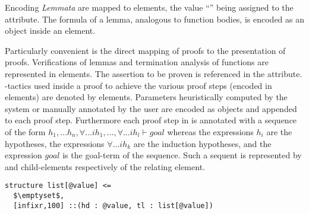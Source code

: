 \begin{omgroup}[id=verifun,short=VeriFun,creators={nmueller}]
\begin{omgroup}{Encoding}
{\emph{Lemmata}} are mapped to {} elements, the value
``{}'' being assigned to the {}
attribute. The formula of a lemma, analogous to function bodies, is encoded as an
{\openmath} object inside an {} element.

Particularly convenient is the direct mapping of {\verifun} proofs to the {\omdoc}
presentation of proofs. Verifications of lemmas and termination analysis of functions are
represented in {} elements. The assertion to be proven is referenced in the
{} attribute. {}-tactics used inside a proof to achieve the
various proof steps (encoded in { elements}) are denoted by
{} elements. Parameters heuristically computed by the system or manually
annotated by the user are encoded as {\openmath} objects and appended to each proof
step. Furthermore each proof step in {\verifun} is annotated with a sequence of the form
$h_1, \dots h_n, \forall \dots ih_1, \dots, \forall \dots ih_l \vdash goal$ whereas the
expressions $h_i$ are the hypotheses, the expressions $\forall \dots ih_k$ are the
induction hypotheses, and the expression $goal$ is the goal-term of the sequence. Such a
sequent is represented by {} and {} child-elements
respectively of the relating {} element.
\begin{lstlisting}[escapechar=\%,mathescape,label=lst:vf:adt,caption={A polymorphic {\verifun} sort}]
structure list[@value] <=
  $\emptyset$,
  [infixr,100] ::(hd : @value, tl : list[@value])
\end{lstlisting}


\end{omgroup}
\end{omgroup}

